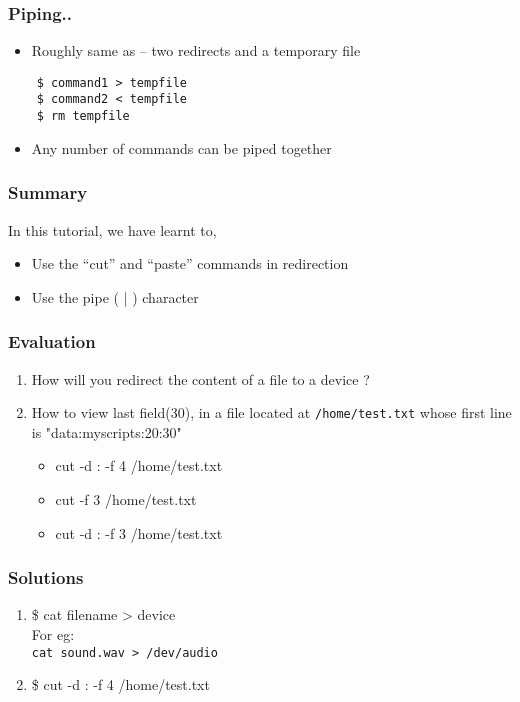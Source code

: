 \documentclass[17pt,compress]{beamer}
\begin{document}
\begin{frame}[fragile]
  \frametitle{Piping..}
  \begin{itemize}
  \item Roughly same as -- two redirects and a temporary file
  \end{itemize}
  \begin{lstlisting}
    $ command1 > tempfile
    $ command2 < tempfile
    $ rm tempfile
\end{lstlisting} %
\begin{itemize}
\item Any number of commands can be piped together
\end{itemize}
\end{frame}


\begin{frame}
\frametitle{Summary}
\label{sec-8}

  In this tutorial, we have learnt to,


\begin{itemize}
\item Use the ``cut'' and ``paste'' commands in redirection
\item Use the pipe ( | ) character
\end{itemize}
\end{frame}
\begin{frame}[fragile]
\frametitle{Evaluation}
\label{sec-9}


\begin{enumerate}
\item How will you redirect the content of a file to a device ?
\vspace{12pt}
\item How to view last field(30), in a file located at \verb~/home/test.txt~ 
whose first line is "data:myscripts:20:30"
\vspace{5pt}
\begin{itemize}
\item cut -d : -f 4 /home/test.txt
\item cut -f 3 /home/test.txt
\item cut -d : -f 3 /home/test.txt
\end{itemize}
\end{enumerate}
\end{frame}
\begin{frame}
\frametitle{Solutions}
\label{sec-10}


\begin{enumerate}
\item \$ cat filename > device\\
For eg:\\
\hspace{8pt} \verb~cat sound.wav > /dev/audio~    
\vspace{22pt}
\item \$ cut -d : -f 4 /home/test.txt
\end{enumerate}
\end{frame}
\end{document}
